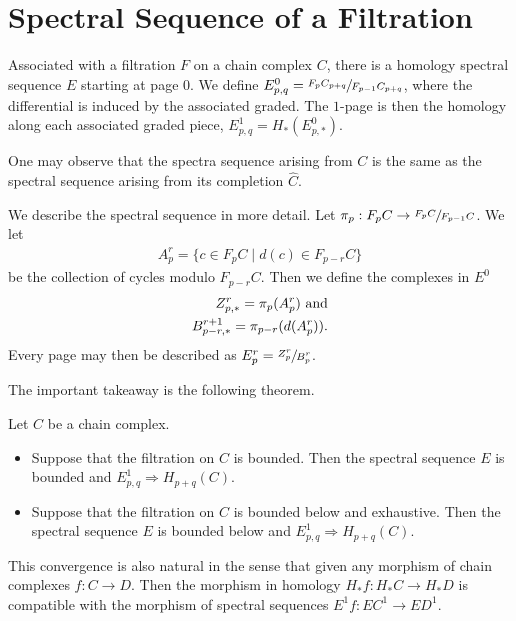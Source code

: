 \documentclass[../thesis.tex]{subfiles}
\begin{document}
    \section{Spectral Sequence of a Filtration}

        Associated with a filtration $F$ on a chain complex $C$, there is a homology spectral sequence $E$ starting at page $0$. We define $E^0_{p,q} = \sfrac{F_pC_{p+q}}{F_{p-1}C_{p+q}}$, where the differential is induced by the associated graded. The $1$-page is then the homology along each associated graded piece, $E^1_{p,q} = H_*(E_{p,*}^0)$.

        One may observe that the spectra sequence arising from $C$ is the same as the spectral sequence arising from its completion $\widehat{C}$.

        We describe the spectral sequence in more detail. Let $\pi_p : F_pC \rightarrow \sfrac{F_pC}{F_{p-1}C}$. We let
        \begin{align*}
            A^r_p = \{c \in F_pC \mid d(c) \in F_{p-r}C\}
        \end{align*}
        be the collection of cycles modulo $F_{p-r}C$. Then we define the complexes in $E^0$
        \begin{align*}
            Z^r_{p,*} = \pi_p(A^r_p)\tt{ and}\\
            B^{r+1}_{p-r,*} = \pi_{p-r}(d(A^r_p))\tt{.}
        \end{align*}
        Every page may then be described as $E^r_p = \sfrac{Z^r_p}{B^r_p}$.

        The important takeaway is the following theorem.
        \begin{thm}\label{thm: class-conv}
            Let $C$ be a chain complex.
            \begin{itemize}
                \item Suppose that the filtration on $C$ is bounded. Then the spectral sequence $E$ is bounded and $E^1_{p,q} \Rightarrow H_{p+q}(C)$.
                \item Suppose that the filtration on $C$ is bounded below and exhaustive. Then the spectral sequence $E$ is bounded below and $E^1_{p,q} \Rightarrow H_{p+q}(C)$.
            \end{itemize}
            This convergence is also natural in the sense that given any morphism of chain complexes $f: C \rightarrow D$. Then the morphism in homology $H_*f: H_*C \rightarrow H_*D$ is compatible with the morphism of spectral sequences $E^1f: EC^1 \rightarrow ED^1$.
        \end{thm}
\end{document}
